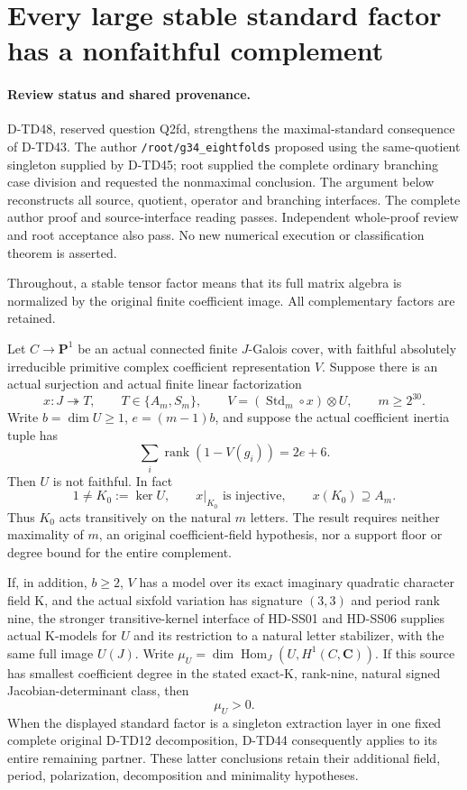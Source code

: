 \section{Every large stable standard factor has a nonfaithful complement}
\label{sec:standard-same-quotient-kernel}

\paragraph{Review status and shared provenance.}
D-TD48, reserved question Q2fd, strengthens the maximal-standard
consequence of D-TD43.  The author \texttt{/root/g34\_eightfolds}
proposed using the same-quotient singleton supplied by D-TD45;
root supplied the complete ordinary branching case division and
requested the nonmaximal conclusion.  The argument below reconstructs
all source, quotient, operator and branching interfaces.  The complete
author proof and source-interface reading passes.  Independent
whole-proof review and root acceptance also pass.
No new numerical execution or classification theorem is asserted.

Throughout, a stable tensor factor means that its full matrix
algebra is normalized by the original finite coefficient image.
All complementary factors are retained.

\begin{theorem}[D-TD48]
Let \(C\to\mathbf P^1\) be an actual connected finite \(J\)-Galois
cover, with faithful absolutely irreducible primitive complex
coefficient representation \(V\).  Suppose there is an actual
surjection and actual finite linear factorization
\[
 x:J\twoheadrightarrow T,\qquad T\in\{A_m,S_m\},\qquad
 V=(\operatorname{Std}_m\circ x)\otimes U,\qquad
 m\ge2^{30}.
 \tag{SQK.1}
\]
Write \(b=\dim U\ge1\), \(e=(m-1)b\), and suppose the actual
coefficient inertia tuple has
\[
                    \sum_i\operatorname{rank}(1-V(g_i))=2e+6.
 \tag{SQK.2}
\]
Then \(U\) is not faithful.  In fact
\[
  1\ne K_0:=\ker U,\qquad
  x|_{K_0}\text{ is injective},\qquad
  x(K_0)\supseteq A_m.
 \tag{SQK.3}
\]
Thus \(K_0\) acts transitively on the natural \(m\) letters.
The result requires neither maximality of \(m\), an original
coefficient-field hypothesis, nor a support floor or degree bound
for the entire complement.

If, in addition, \(b\ge2\), \(V\) has a model over its exact
imaginary quadratic character field K, and the actual sixfold
variation has signature \((3,3)\) and period rank nine, the
stronger transitive-kernel interface of HD-SS01 and HD-SS06
supplies actual K-models for \(U\) and its restriction to a
natural letter stabilizer, with the same full image \(U(J)\).
Write \(\mu_U=\dim\operatorname{Hom}_J(U,H^1(C,\mathbf C))\).
If this source has smallest coefficient degree in the stated
exact-K, rank-nine, natural signed Jacobian-determinant class,
then
\[
                              \mu_U>0.
 \tag{SQK.4}
\]
When the displayed standard factor is a singleton extraction
layer in one fixed complete original D-TD12 decomposition,
D-TD44 consequently applies to its entire remaining partner.
These latter conclusions retain their additional field, period,
polarization, decomposition and minimality hypotheses.
\end{theorem}

